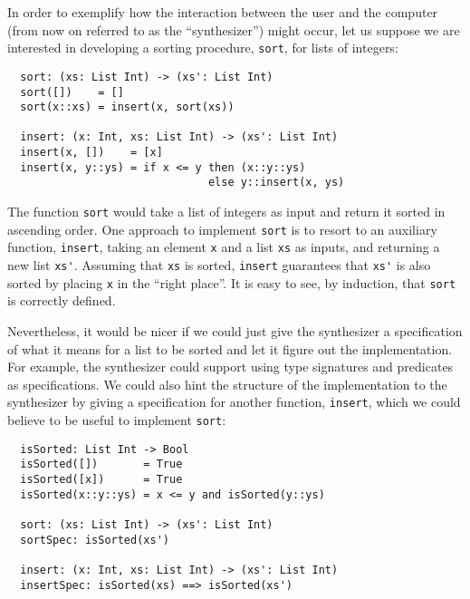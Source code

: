 In order to exemplify how the interaction between the user and the computer
(from now on referred to as the ``synthesizer'') might occur, let us suppose we
are interested in developing a sorting procedure, \lstinline{sort}, for lists of
integers:



\begin{lstlisting}
  sort: (xs: List Int) -> (xs': List Int)
  sort([])    = []
  sort(x::xs) = insert(x, sort(xs))

  insert: (x: Int, xs: List Int) -> (xs': List Int)
  insert(x, [])    = [x]
  insert(x, y::ys) = if x <= y then (x::y::ys)
                               else y::insert(x, ys)
\end{lstlisting}

The function \lstinline{sort} would take a list of integers as input and return
it sorted in ascending order. One approach to implement \lstinline{sort} is to
resort to an auxiliary function, \lstinline{insert}, taking an element
\lstinline{x} and a list \lstinline{xs} as inputs, and returning a new list
\lstinline{xs'}. Assuming that \lstinline{xs} is sorted, \lstinline{insert}
guarantees that \lstinline{xs'} is also sorted by placing \lstinline{x} in the
``right place''. It is easy to see, by induction, that \lstinline{sort} is
correctly defined.

Nevertheless, it would be nicer if we could just give the synthesizer a
specification of what it means for a list to be sorted and let it figure out the
implementation. For example, the synthesizer could support using type signatures
and predicates as specifications. We could also hint the structure of the
implementation to the synthesizer by giving a specification for another
function, \lstinline{insert}, which we could believe to be useful to implement
\lstinline{sort}:

\begin{lstlisting}
  isSorted: List Int -> Bool
  isSorted([])       = True
  isSorted([x])      = True
  isSorted(x::y::ys) = x <= y and isSorted(y::ys)

  sort: (xs: List Int) -> (xs': List Int)
  sortSpec: isSorted(xs')

  insert: (x: Int, xs: List Int) -> (xs': List Int)
  insertSpec: isSorted(xs) ==> isSorted(xs')
\end{lstlisting}

